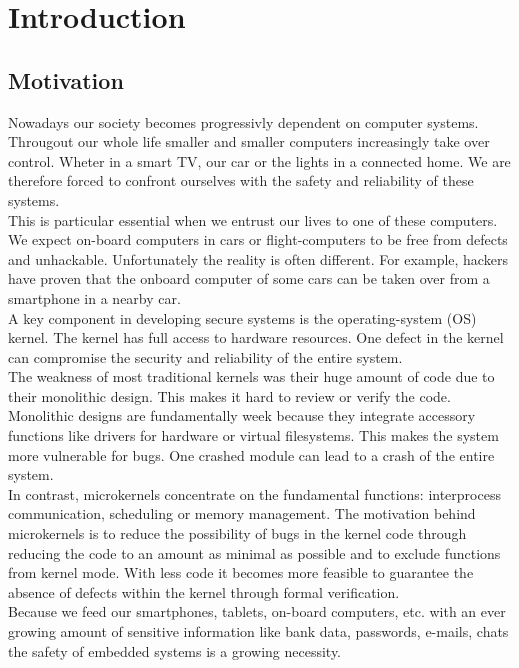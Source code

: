 \section{Introduction}
	\subsection{Motivation}
Nowadays our society becomes progressivly dependent on computer systems.\\ Througout our whole life smaller and smaller computers increasingly take over control. Wheter in a smart TV, our car or the lights in a connected home. We are therefore forced to confront ourselves with the safety and reliability of these systems. \\
This is particular essential when we entrust our lives to one of these computers. We expect on-board computers in cars or flight-computers to be free from defects and unhackable. Unfortunately the reality is often different. For example, hackers have proven that the onboard computer of some cars can be taken over from a smartphone in a nearby car. \\
A key component in developing secure systems is the operating-system (OS) kernel. The kernel has full access to hardware resources. One defect in the kernel can compromise the security and reliability of the entire system. \\
The weakness of most traditional kernels was their huge amount of code due to their monolithic design. This makes it hard to review or verify the code. Monolithic designs are fundamentally week because they integrate accessory functions like drivers for hardware or virtual filesystems. This makes the system more vulnerable for bugs. One crashed module can lead to a crash of the entire system. \\
In contrast, microkernels concentrate on the fundamental functions: interprocess communication, scheduling or memory management. The motivation behind microkernels is to reduce the  possibility of bugs in the kernel code through reducing the code to an amount as minimal as possible and to exclude functions from kernel mode. With less code it becomes more feasible to guarantee the absence of defects within the kernel through formal verification.\\
Because we feed our smartphones, tablets, on-board computers, etc. with an ever growing amount of sensitive information like bank data, passwords, e-mails, chats the safety of embedded systems is a growing necessity. \\
